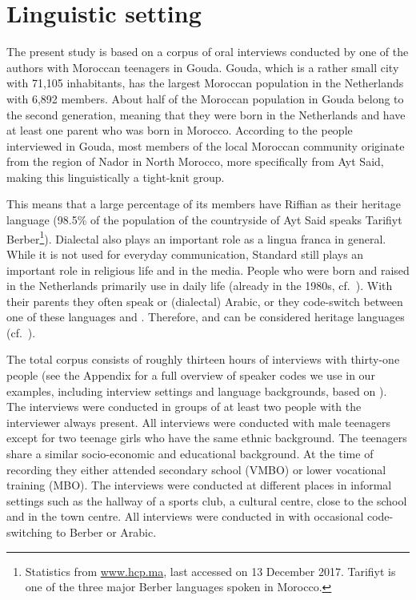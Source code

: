 \documentclass[output=paper]{langsci/langscibook}
\begin{document}
\section{Linguistic setting}
\label{sec:lingset}
\noindent The present study is based on a corpus of oral interviews conducted
by one of the authors with Moroccan  teenagers in Gouda. Gouda, which is a
rather small city with 71,105 inhabitants, has the largest Moroccan 
population in the Netherlands with 6,892 members. About half of the Moroccan
population in Gouda belong to the second generation, meaning that they were
born in the Netherlands and have at least one parent who was born in Morocco.
According to the people interviewed in Gouda, most members of the local
Moroccan  community originate from the region of Nador in North Morocco,
more specifically from Ayt Said, making this linguistically a tight-knit group.

This means that a large percentage of its members have Riffian  as their
heritage language (98.5\% of the population of the countryside of Ayt Said
speaks Tarifiyt Berber\footnote{Statistics from \url{www.hcp.ma}, last
accessed on 13 December 2017. Tarifiyt  is one of the three major Berber
languages spoken in Morocco.}). Dialectal  also plays an important role
as a lingua franca in general. While it is not used for everyday communication,
Standard  still plays an important role in religious life and in the
media. People who were born and raised in the Netherlands primarily use 
in daily life (already in the 1980s, cf.\ \citealt{DeRuiter:1989}). With their
parents they often speak  or (dialectal) Arabic, or they
code-switch between one of these languages and . Therefore,
 and  can be considered heritage languages (cf.\
\citealt{Montrul:2016}).

The total corpus consists of roughly thirteen hours of interviews with
thirty-one people (see the Appendix for a full overview of speaker
codes we use in our examples, including interview settings and language
backgrounds, based on \citealt{Mourigh:fc}). The interviews were conducted in
groups of at least two people with the interviewer always present. All
interviews were conducted with male teenagers except for two teenage girls who
have the same ethnic background. The teenagers share a similar socio-economic
and educational background. At the time of recording they either attended
secondary school (VMBO) or lower vocational training (MBO). The interviews were
conducted at different places in informal settings such as the hallway of a
sports club, a cultural centre, close to the school and in the town centre.
All interviews were conducted in \ili{Dutch} with occasional code-switching to Berber
or Arabic.
\end{document}
